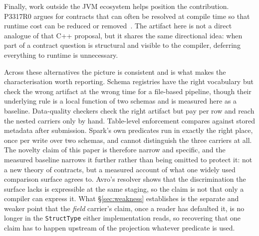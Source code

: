 Finally, work outside the JVM ecosystem helps position the contribution. P3317R0 argues for contracts that can often be resolved at compile time so that runtime cost can be reduced or removed~\cite{compile_time_resolved_contracts}. The artifact here is not a direct analogue of that C++ proposal, but it shares the same directional idea: when part of a contract question is structural and visible to the compiler, deferring everything to runtime is unnecessary.

Across these alternatives the picture is consistent and is what makes the characterisation worth reporting. Schema registries have the right vocabulary but check the wrong artifact at the wrong time for a file-based pipeline, though their underlying rule is a local function of two schemas and is measured here as a baseline. Data-quality checkers check the right artifact but pay per row and reach the nested carriers only by hand. Table-level enforcement compares against stored metadata after submission. Spark's own predicates run in exactly the right place, once per write over two schemas, and cannot distinguish the three carriers at all. The novelty claim of this paper is therefore narrow and specific, and the measured baseline narrows it further rather than being omitted to protect it: not a new theory of contracts, but a measured account of what one widely used comparison surface agrees to. Avro's resolver shows that the discrimination the surface lacks is expressible at the same staging, so the claim is not that only a compiler can express it. What \S\ref{sec:weakness} establishes is the separate and weaker point that the \emph{field} carrier's claim, once a reader has defaulted it, is no longer in the \texttt{StructType} either implementation reads, so recovering that one claim has to happen upstream of the projection whatever predicate is used.
